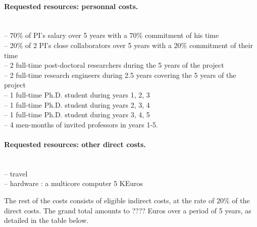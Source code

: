 \paragraph{Requested resources: personnal costs.}\mbox{}\\
-- 70\% of PI's salary over 5 years with a 70\% commitment of his time\\
-- 20\% of 2 PI's close collaborators over 5 years with a 20\% commitment of their time\\
-- 2 full-time post-doctoral researchers during the 5 years of the project\\
-- 2 full-time research engineers during 2.5 years covering the 5 years of the project\\
-- 1 full-time Ph.D. student during years 1, 2, 3\\
-- 1 full-time Ph.D. student during years 2, 3, 4\\
-- 1 full-time Ph.D. student during years 3, 4, 5\\
-- 4 men-months of invited professors in years 1-5.

\paragraph{Requested resources: other direct costs.}\mbox{}\\
-- travel \\
-- hardware : a multicore computer 5 KEuros

The rest of the costs consists of eligible indirect costs, at the rate of 20\% of the direct costs. 
The grand total amounts to ???? Euros over a period of 5 years, as detailed in the table below.



